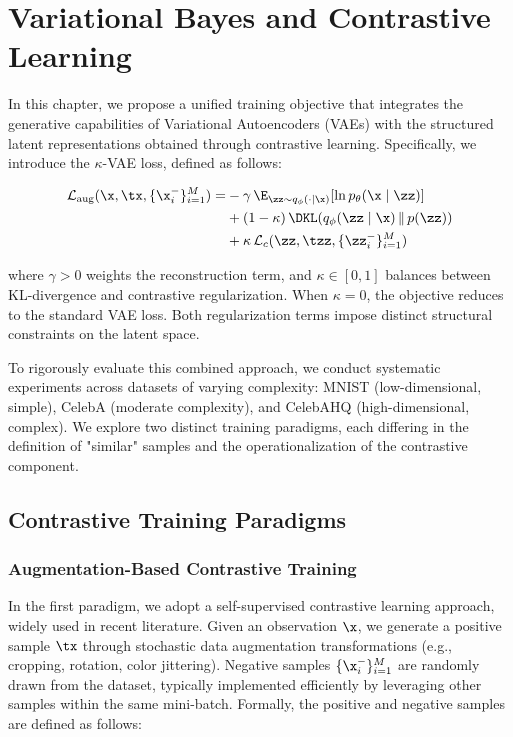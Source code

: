 \chapter{Variational Bayes and Contrastive Learning}
\label{ch:kappa-vae}

In this chapter, we propose a unified training objective that integrates the generative capabilities of Variational Autoencoders (VAEs) with the structured latent representations obtained through contrastive learning. Specifically, we introduce the $\kappa$-VAE loss, defined as follows:

\begin{align}
    \mathcal{L}_{\text{aug}}(\x, \tx, \{\x_i^-\}_{i=1}^M) =
     & -\gamma \, \E_{\zz \sim q_{\phi}(\cdot \mid \x)}[\ln p_{\theta}(\x \mid \zz)] \\
     & + (1-\kappa)\,\DKL(q_{\phi}(\zz \mid \x)\,\|\,p(\zz))                         \\
     & + \kappa\,\mathcal{L}_{c}(\zz, \tzz, \{\zz_{i}^-\}_{i=1}^{M})
\end{align}


where $\gamma > 0$ weights the reconstruction term, and $\kappa \in [0,1]$ balances between KL-divergence and contrastive regularization. When $\kappa = 0$, the objective reduces to the standard VAE loss. Both regularization terms impose distinct structural constraints on the latent space.

To rigorously evaluate this combined approach, we conduct systematic experiments across datasets of varying complexity: MNIST (low-dimensional, simple), CelebA (moderate complexity), and CelebAHQ (high-dimensional, complex). We explore two distinct training paradigms, each differing in the definition of "similar" samples and the operationalization of the contrastive component.

\section{Contrastive Training Paradigms}

\subsection{Augmentation-Based Contrastive Training}

In the first paradigm, we adopt a self-supervised contrastive learning approach, widely used in recent literature. Given an observation $\x$, we generate a positive sample $\tx$ through stochastic data augmentation transformations (e.g., cropping, rotation, color jittering). Negative samples $\{\x_i^-\}_{i=1}^M$ are randomly drawn from the dataset, typically implemented efficiently by leveraging other samples within the same mini-batch. Formally, the positive and negative samples are defined as follows:

